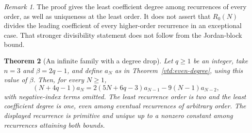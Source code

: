 \documentclass[11pt,a4paper]{article}
\newtheorem{theorem}{Theorem}[section]
\theoremstyle{definition}
\theoremstyle{remark}
\newtheorem{remark}[theorem]{Remark}
\numberwithin{equation}{section}
\begin{document}
\begin{remark}
The proof gives the least coefficient degree among recurrences of
every order, as well as uniqueness at the least order.  It does not
assert that $R_0(N)$ divides the leading coefficient of every
higher-order recurrence in an exceptional case.  That stronger
divisibility statement does not follow from the Jordan-block bound.
\end{remark}

\begin{theorem}[An infinite family with a degree drop]
\label{vtd:odd-degree-drop}
Let $q\ge1$ be an integer, take $n=3$ and $\beta=2q-1$, and define
$a_N$ as in Theorem~\ref{vtd:even-degree}, using this value of $\beta$.
Then, for every $N\ge1$,
\begin{equation}\label{vtd:odd-recurrence}
 (N+4q-1)a_N
       =2(5N+6q-3)a_{N-1}-9(N-1)a_{N-2},
\end{equation}
with negative-index terms omitted.  The least recurrence order is two
and the least coefficient degree is one, even among eventual
recurrences of arbitrary order.  The displayed recurrence is primitive
and unique up to a nonzero constant among recurrences attaining both
bounds.
\end{theorem}
\end{document}
